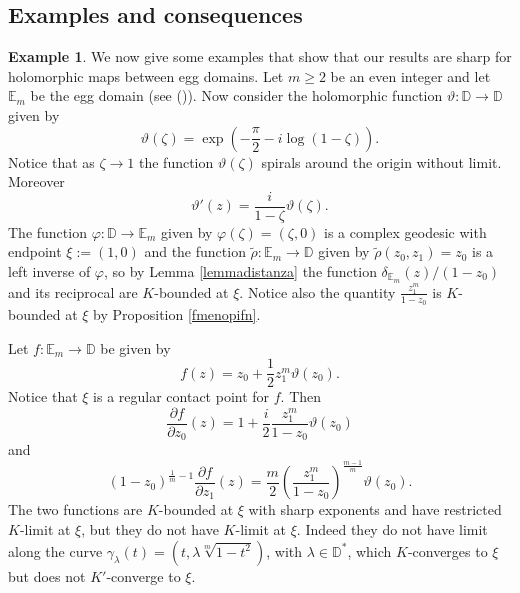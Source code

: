 \documentclass[11pt, reqno]{amsart}
\numberwithin{equation}{section}
\theoremstyle{definition}
\newtheorem{example}[theorem]{Example}
\newcommand{\D}{\mathbb{D}}
\begin{document}
{{{		\subsection{Examples and consequences}
		\begin{example}\label{exJWC}
			We now give some examples  that show that our results are sharp for holomorphic maps between egg domains. Let $m\geq2$ be an even integer and let $\mathbb{E}_m$ be the egg domain (see ()).
			Now consider the holomorphic function
			$\vartheta \colon\D\to\D$ given by
			$$\vartheta(\zeta)=\exp\left(-\frac{\pi}{2}-i\log(1-\zeta)\right).$$
			Notice that as $\zeta\to1$ the function $\vartheta(\zeta)$ spirals around the origin without limit.
			Moreover
			$$\vartheta'(z)=\frac{i}{1-\zeta}\vartheta(\zeta).$$
			The function $\varphi\colon \D\to \mathbb{E}_m$ given by $\varphi(\zeta)=(\zeta,0)$ is a complex geodesic with endpoint $\xi:=(1,0)$ and the function $\tilde \rho\colon \mathbb{E}_m\to\D$ given by $\tilde \rho(z_0,z_1)=z_0$ is a left inverse of $\varphi$, so by Lemma \ref{lemmadistanza} the function $\delta_{\mathbb{E}_m}(z)/(1-z_0)$ and its reciprocal are $K$-bounded at $\xi$.
			Notice also the quantity $\frac{z_1^{m}}{1-z_0}$ is $K$-bounded at $\xi$ by Proposition \ref{fmenopifn}. 
			
			Let $f\colon \mathbb{E}_{m}\to\D$ be given by
			$$f(z)=z_0+\frac{1}{2}z_1^{m}\vartheta(z_0).$$
			Notice that $\xi$ is a regular contact point for $f$.
			Then
			$$\frac{\partial f}{\partial z_0}(z)=1+\frac{i}{2}\frac{z_1^{m}}{1-z_0}\vartheta(z_0)$$
			and
			$$(1-z_0)^{\frac{1}{m}-1}\frac{\partial f}{\partial z_1}(z)=\frac{m}{2}\left(\frac{z_1^{m}}{1-z_0}\right)^\frac{m-1}{m}\vartheta(z_0).$$
			The two functions are $K$-bounded at $\xi$ with sharp exponents and  have restricted $K$-limit at $\xi$, but they do not have $K$-limit at $\xi$. Indeed they do not have limit along the curve $\gamma_\lambda(t)=(t,\lambda\sqrt[m]{1-t^2})$, with $\lambda\in\D^*$, which $K$-converges to $\xi$ but does not $K'$-converge to $\xi$.
			

\end{example}}}}
\end{document}
